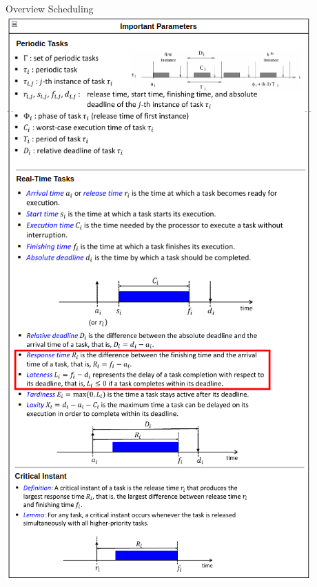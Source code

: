 \begin{frame}[allowframebreaks]{Overview Scheduling}
  \includegraphics[height=0.7\paperheight]{./figures/important_parameters.png}


\end{frame}
